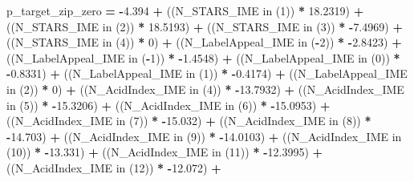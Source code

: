 \documentclass[]{article}
\newenvironment{Shaded}{\begin{snugshade}}{\end{snugshade}}
\newcommand{\KeywordTok}[1]{\textcolor[rgb]{0.13,0.29,0.53}{\textbf{{#1}}}}
\newcommand{\DecValTok}[1]{\textcolor[rgb]{0.00,0.00,0.81}{{#1}}}
\newcommand{\FloatTok}[1]{\textcolor[rgb]{0.00,0.00,0.81}{{#1}}}
\newcommand{\NormalTok}[1]{{#1}}
\begin{document}
\begin{Shaded}
\begin{Highlighting}[]
{{{{{{{{{{{{{{{{{{{{{{{{{{{{{{{{{{{{{{{{{{{{{{{{{    \NormalTok{p_target_zip_zero }\KeywordTok{=} \KeywordTok{-}\FloatTok{4.394} \KeywordTok{+}
    \NormalTok{((N_STARS_IME  in (}\DecValTok{1}\NormalTok{)) }\KeywordTok{*}   \FloatTok{18.2319}\NormalTok{)   }\KeywordTok{+}
    \NormalTok{((N_STARS_IME  in (}\DecValTok{2}\NormalTok{)) }\KeywordTok{*}   \FloatTok{18.5193}\NormalTok{)   }\KeywordTok{+}
    \NormalTok{((N_STARS_IME  in (}\DecValTok{3}\NormalTok{)) }\KeywordTok{*}   \KeywordTok{-}\FloatTok{7.4969}\NormalTok{)   }\KeywordTok{+}
    \NormalTok{((N_STARS_IME  in (}\DecValTok{4}\NormalTok{)) }\KeywordTok{*}   \DecValTok{0}\NormalTok{)   }\KeywordTok{+}
    \NormalTok{((N_LabelAppeal_IME  in (}\KeywordTok{-}\DecValTok{2}\NormalTok{)) }\KeywordTok{*}   \KeywordTok{-}\FloatTok{2.8423}\NormalTok{)   }\KeywordTok{+}
    \NormalTok{((N_LabelAppeal_IME  in (}\KeywordTok{-}\DecValTok{1}\NormalTok{)) }\KeywordTok{*}   \KeywordTok{-}\FloatTok{1.4548}\NormalTok{)   }\KeywordTok{+}
    \NormalTok{((N_LabelAppeal_IME  in (}\DecValTok{0}\NormalTok{)) }\KeywordTok{*}   \KeywordTok{-}\FloatTok{0.8331}\NormalTok{)   }\KeywordTok{+}
    \NormalTok{((N_LabelAppeal_IME  in (}\DecValTok{1}\NormalTok{)) }\KeywordTok{*}   \KeywordTok{-}\FloatTok{0.4174}\NormalTok{)   }\KeywordTok{+}
    \NormalTok{((N_LabelAppeal_IME  in (}\DecValTok{2}\NormalTok{)) }\KeywordTok{*}   \DecValTok{0}\NormalTok{)   }\KeywordTok{+}
    \NormalTok{((N_AcidIndex_IME  in (}\DecValTok{4}\NormalTok{)) }\KeywordTok{*}   \KeywordTok{-}\FloatTok{13.7932}\NormalTok{)   }\KeywordTok{+}
    \NormalTok{((N_AcidIndex_IME  in (}\DecValTok{5}\NormalTok{)) }\KeywordTok{*}   \KeywordTok{-}\FloatTok{15.3206}\NormalTok{)   }\KeywordTok{+}
    \NormalTok{((N_AcidIndex_IME  in (}\DecValTok{6}\NormalTok{)) }\KeywordTok{*}   \KeywordTok{-}\FloatTok{15.0953}\NormalTok{)   }\KeywordTok{+}
    \NormalTok{((N_AcidIndex_IME  in (}\DecValTok{7}\NormalTok{)) }\KeywordTok{*}   \KeywordTok{-}\FloatTok{15.032}\NormalTok{)   }\KeywordTok{+}
    \NormalTok{((N_AcidIndex_IME  in (}\DecValTok{8}\NormalTok{)) }\KeywordTok{*}   \KeywordTok{-}\FloatTok{14.703}\NormalTok{)   }\KeywordTok{+}
    \NormalTok{((N_AcidIndex_IME  in (}\DecValTok{9}\NormalTok{)) }\KeywordTok{*}   \KeywordTok{-}\FloatTok{14.0103}\NormalTok{)   }\KeywordTok{+}
    \NormalTok{((N_AcidIndex_IME  in (}\DecValTok{10}\NormalTok{)) }\KeywordTok{*}   \KeywordTok{-}\FloatTok{13.331}\NormalTok{)   }\KeywordTok{+}
    \NormalTok{((N_AcidIndex_IME  in (}\DecValTok{11}\NormalTok{)) }\KeywordTok{*}   \KeywordTok{-}\FloatTok{12.3995}\NormalTok{)   }\KeywordTok{+}
    \NormalTok{((N_AcidIndex_IME  in (}\DecValTok{12}\NormalTok{)) }\KeywordTok{*}   \KeywordTok{-}\FloatTok{12.072}\NormalTok{)   }\KeywordTok{+}
}}}}}}}}}}}}}}}}}}}}}}}}}}}}}}}}}}}}}}}}}}}}}}}}}
\end{Highlighting}
\end{Shaded}
\end{document}
